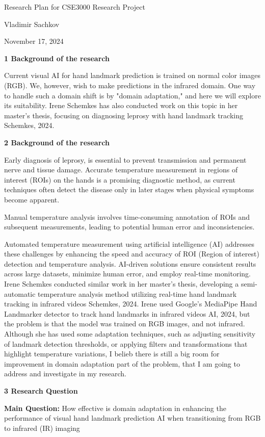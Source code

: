 \documentclass[
]{article}
\author{}
\date{}
\begin{document}
Research Plan for CSE3000 Research Project

Vladimir Sachkov

November 17, 2024

\textbf{1 Background of the research}

Current visual AI for hand landmark prediction is trained on normal
color images (RGB). We, however, wish to make predictions in the
infrared domain. One way to handle such a domain shift is by "domain
adaptation," and here we will explore its suitability. Irene Schemkes
has also conducted work on this topic in her master's thesis, focusing
on diagnosing leprosy with hand landmark tracking Schemkes, 2024.

\textbf{2 Background of the research}

Early diagnosis of leprosy, is essential to prevent transmission and
permanent nerve and tissue damage. Accurate temperature measurement in
regions of interest (ROIs) on the hands is a promising diagnostic
method, as current techniques often detect the disease only in later
stages when physical symptoms become apparent.

Manual temperature analysis involves time-consuming annotation of ROIs
and subsequent measurements, leading to potential human error and
inconsistencies.

Automated temperature measurement using artificial intelligence (AI)
addresses these challenges by enhancing the speed and accuracy of ROI
(Region of interest) detection and temperature analysis. AI-driven
solutions ensure consistent results across large datasets, minimize
human error, and employ real-time monitoring. Irene Schemkes conducted
similar work in her master's thesis, developing a semi-automatic
temperature analysis method utilizing real-time hand landmark tracking
in infrared videos Schemkes, 2024. Irene used Google's MediaPipe Hand
Landmarker detector to track hand landmarks in infrared videos AI, 2024,
but the problem is that the model was trained on RGB images, and not
infrared. Although she has used some adaptation techniques, such as
adjusting sensitivity of landmark detection thresholds, or applying
filters and transformations that highlight temperature variations, I
belieb there is still a big room for improvement in domain adaptation
part of the problem, that I am going to address and investigate in my
research.

\textbf{3 Research Question}

\textbf{Main Question:} How effective is domain adaptation in enhancing
the performance of visual hand landmark prediction AI when transitioning
from RGB to infrared (IR) imaging
\end{document}
